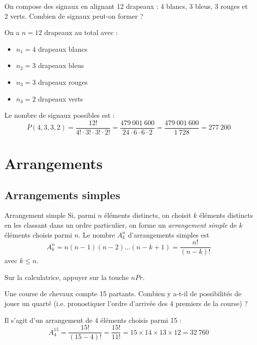 \documentclass[a4paper,12pt]{article}
\begin{document}
\begin{exemple}
	\tcblower
	On compose des signaux en alignant 12 drapeaux : 4 blancs, 3 bleus, 3 rouges et 2 verts. Combien de signaux peut-on former ?

	On a $n = 12$ drapeaux au total avec :
	\begin{itemize}
		\item $n_1 = 4$ drapeaux blancs
		\item $n_2 = 3$ drapeaux bleus  
		\item $n_3 = 3$ drapeaux rouges
		\item $n_4 = 2$ drapeaux verts
	\end{itemize}

	Le nombre de signaux possibles est :
	\[\overline{P}(4,3,3,2) = \frac{12!}{4! \cdot 3! \cdot 3! \cdot 2!} = \frac{479~001~600}{24 \cdot 6 \cdot 6 \cdot 2} = \frac{479~001~600}{1~728} = 277~200\]
\end{exemple}

\section{Arrangements}

\subsection{Arrangements simples}

\begin{definition}
	Arrangement simple
	\tcblower
	Si, parmi $n$ éléments distincts, on choisit $k$ éléments distincts en les classant dans un ordre particulier, on forme un \emph{arrangement simple} de $k$ éléments choisis parmi $n$. Le nombre $A_k^n$ d'arrangements simples est
	\[A_k^n = n(n-1)(n-2)\ldots(n-k+1) = \frac{n!}{(n-k)!}\]
	avec $k \leq n$.
\end{definition}

\begin{remarque}
	\tcblower
	Sur la calculatrice, appuyer sur la touche $nPr$.
\end{remarque}

\begin{exemple}
	\tcblower
	Une course de chevaux compte 15 partants. Combien y a-t-il de possibilités de jouer un quarté (i.e. pronostiquer l'ordre d'arrivée des 4 premiers de la course) ?

	Il s'agit d'un arrangement de 4 éléments choisis parmi 15 :
	\[A_4^{15} = \frac{15!}{(15-4)!} = \frac{15!}{11!} = 15 \times 14 \times 13 \times 12 = 32~760\]
\end{exemple}
\end{document}

